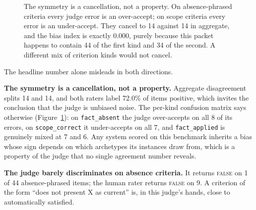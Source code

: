 \documentclass[11pt]{article}
\newcommand{\code}[1]{\texttt{\small #1}}
\begin{document}
\begin{figure}[tb]
\centering
{}
\caption{The symmetry is a cancellation, not a property. On absence-phrased
criteria every judge error is an over-accept; on scope criteria every error is an
under-accept. They cancel to 14 against 14 in aggregate, and the bias index is
exactly 0.000, purely because this packet happens to contain 44 of the first kind
and 34 of the second. A different mix of criterion kinds would not cancel.}
\label{fig:cancellation}
\end{figure}

The headline number alone misleads in both directions.

\textbf{The symmetry is a cancellation, not a property.} Aggregate disagreement
splits 14 and 14, and both raters label 72.0\% of items positive, which invites
the conclusion that the judge is unbiased noise. The per-kind confusion matrix
says otherwise (Figure~\ref{fig:cancellation}): on \code{fact\_absent} the judge
over-accepts on all 8 of its errors, on \code{scope\_correct} it under-accepts on
all 7, and \code{fact\_applied} is genuinely mixed at 7 and 6. Any system scored
on this benchmark inherits a bias whose sign depends on which archetypes its
instances draw from, which is a property of the judge that no single agreement
number reveals.

\textbf{The judge barely discriminates on absence criteria.} It returns
\textsc{false} on 1 of 44 absence-phrased items; the human rater returns
\textsc{false} on 9. A criterion of the form ``does not present X as current''
is, in this judge's hands, close to automatically satisfied.
\end{document}
